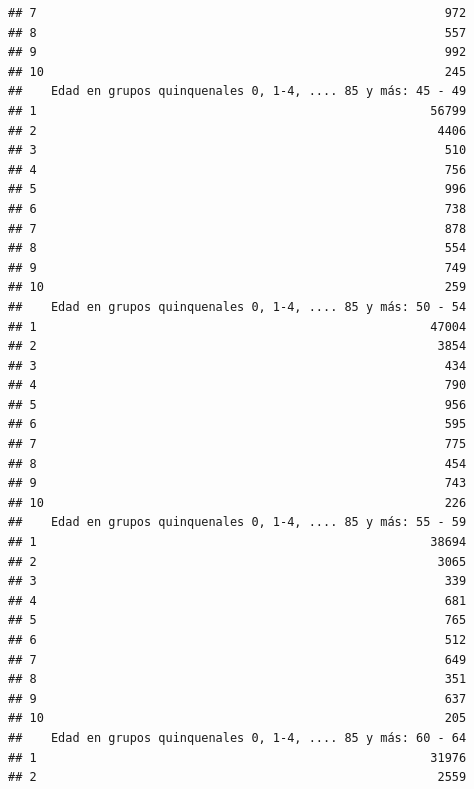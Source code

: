 \documentclass[11pt,]{article}
\begin{document}
\begin{verbatim}
## 7                                                         972
## 8                                                         557
## 9                                                         992
## 10                                                        245
##    Edad en grupos quinquenales 0, 1-4, .... 85 y más: 45 - 49
## 1                                                       56799
## 2                                                        4406
## 3                                                         510
## 4                                                         756
## 5                                                         996
## 6                                                         738
## 7                                                         878
## 8                                                         554
## 9                                                         749
## 10                                                        259
##    Edad en grupos quinquenales 0, 1-4, .... 85 y más: 50 - 54
## 1                                                       47004
## 2                                                        3854
## 3                                                         434
## 4                                                         790
## 5                                                         956
## 6                                                         595
## 7                                                         775
## 8                                                         454
## 9                                                         743
## 10                                                        226
##    Edad en grupos quinquenales 0, 1-4, .... 85 y más: 55 - 59
## 1                                                       38694
## 2                                                        3065
## 3                                                         339
## 4                                                         681
## 5                                                         765
## 6                                                         512
## 7                                                         649
## 8                                                         351
## 9                                                         637
## 10                                                        205
##    Edad en grupos quinquenales 0, 1-4, .... 85 y más: 60 - 64
## 1                                                       31976
## 2                                                        2559

\end{verbatim}
\end{document}
